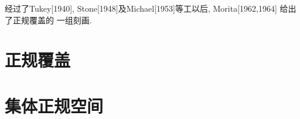 \documentclass[main.tex]{subfiles}
\begin{document}
经过了Tukey[1940], Stone[1948]及Michael[1953]等工以后, Morita[1962,1964]
给出了正规覆盖的
一组刻画.


\section{正规覆盖}\label{ch3.1}

	
\section{集体正规空间}\label{ch3.2}

	
\end{document}
